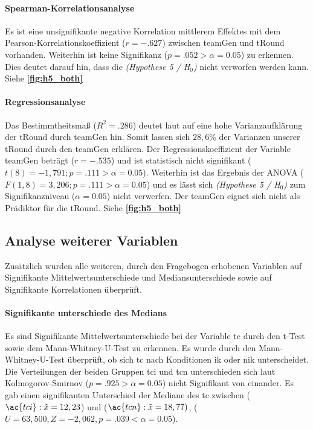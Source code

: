 \documentclass[a4paper,11pt]{article}%
\renewcommand{\\}{\vspace*{0.5\baselineskip} \newline}
\begin{document}
			\paragraph{Spearman-Korrelationsanalyse}
Es ist eine unsignifikante negative Korrelation mittlerem Effektes mit dem Pearson-Korrelationskoeffizient ($r = -.627$) zwischen \ac{teamGen} und \ac{tRound} vorhanden. Weiterhin ist keine Signifikanz ($p = .052 > \alpha = 0.05$) zu erkennen. Dies deutet darauf hin, dass die \textit{(Hypothese 5 / H$_{0}$)} nicht verworfen werden kann. Siehe \textbf{\autoref{fig:h5_both}}
			
			\paragraph{Regressionsanalyse}
Das Bestimmtheitsmaß ($R^{2} = .286$) deutet laut \citep{cohen2013statistical} auf eine hohe Varianzaufklärung der \ac{tRound} durch \ac{teamGen} hin. Somit lassen sich $28,6\%$ der Varianzen unserer \ac{tRound} durch den \ac{teamGen} erklären. \\
Der Regressionskoeffizient der Variable \ac{teamGen} beträgt ($r = -.535$) und ist statistisch nicht signifikant ($t(8) = -1,791; p = .111 > \alpha = 0.05$). \\
Weiterhin ist das Ergebnis der ANOVA ($F(1,8) = 3,206; p = .111 > \alpha = 0.05$) und es lässt sich \textit{(Hypothese 5 / H$_{0}$)} zum Signifikanzniveau ($\alpha = 0.05$) nicht verwerfen. \\
Der \ac{teamGen} eignet sich nicht als Prädiktor für die \ac{tRound}.\\
Siehe \textbf{\autoref{fig:h5_both}}

\newpage
\subsection{Analyse weiterer Variablen}
Zusätzlich wurden alle weiteren, durch den Fragebogen erhobenen Variablen auf Signifikante Mittelwertsunterschiede und Mediansunterschiede sowie auf Signifikante Korrelationen überprüft.

\paragraph{Signifikante unterschiede des Medians}
Es sind Signifikante Mittelwertsunterschiede bei der Variable \ac{tc} durch den t-Test sowie dem Mann-Whitney-U-Test zu erkennen.
Es wurde durch den Mann-Whitney-U-Test überprüft, ob sich \ac{tc} nach Konditionen \ac{ik} oder \ac{nik} unterscheidet. Die Verteilungen der beiden Gruppen \ac{tci} und \ac{tcn} unterschieden sich laut Kolmogorov-Smirnov ($p = .925 > \alpha = 0.05$) nicht Signifikant von einander. Es gab einen signifikanten Unterschied der Mediane des \ac{tc} zwischen ($\ac{tci} : \tilde x = 12,23$) und ($\ac{tcn} : \tilde x = 18,77)$, ($U = 63,500, Z = -2,062, p = .039 < \alpha = 0.05$).
\end{document}
